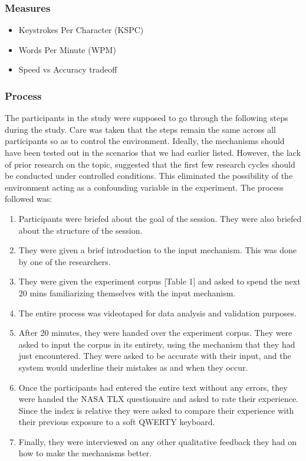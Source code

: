 \subsubsection{Measures}
\begin{itemize}
	\item Keystrokes Per Character (KSPC)
	\item Words Per Minute (WPM)
	\item Speed vs Accuracy tradeoff 
\end{itemize}
\subsubsection{Process}

The participants in the study were supposed to go through the
following steps during the study. Care was taken that the steps remain
the same across all participants so as to control the
environment. Ideally, the mechanisms should have been tested out in
the scenarios that we had earlier listed. However, the lack of prior
research on the topic, suggested that the first few research cycles
should be conducted under controlled conditions. This eliminated the
possibility of the environment acting as a confounding variable in the
experiment. The process followed was:

\begin{enumerate}
\item Participants were briefed about the goal of the session. They
  were also briefed about the structure of the session.
\item They were given a brief introduction to the input
  mechanism. This was done by one of the researchers.
\item They were given the experiment corpus [Table 1] and asked to spend the next 20
  mins familiarizing themselves with the input mechanism.
\item The entire process was videotaped for data analysis and
  validation purposes.
\item After 20 minutes, they were handed over the experiment
  corpus. They were asked to input the corpus in its entirety, using
  the mechanism that they had just encountered. They were asked to be
  accurate with their input, and the system would underline their
  mistakes as and when they occur.
\item Once the participants had entered the entire text without any
  errors, they were handed the NASA TLX questionaire and asked to rate
  their experience. Since the index is relative they were asked to
  compare their experience with their previous exposure to a soft
  QWERTY keyboard. 
\item Finally, they were interviewed on any other qualitative feedback
  they had on how to make the mechanisms better.
\end{enumerate}
	